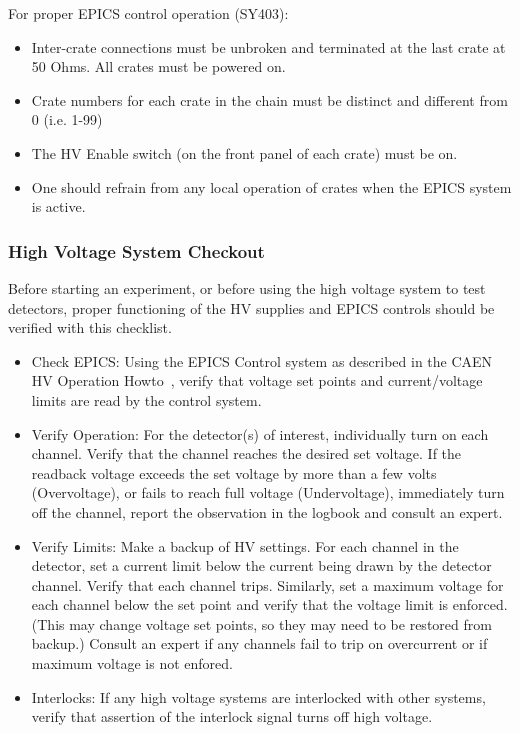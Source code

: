 {For proper EPICS control operation (SY403):

\begin{itemize}
\item{Inter-crate connections must be unbroken and terminated at the
last crate at 50 Ohms.  All crates must be powered on.}
\item{Crate numbers for each crate in the chain must be distinct and
different from 0 (i.e. 1-99)}
\item{The HV Enable switch (on the front panel of each crate) must be on.}
\item{One should refrain from any local operation of crates when the
EPICS system is active.}
\end{itemize}
}

\subsubsection{High Voltage System Checkout}
\label{sec:highvoltagecheckout}

Before starting an experiment, or before using the high voltage system to
test detectors, proper functioning of the HV supplies and EPICS controls
should be verified with this checklist.
\begin{itemize}
  \item{Check EPICS: Using the EPICS Control system as described in the CAEN HV
  Operation Howto~\cite{howto:CAEN_HV_operation}, verify that voltage set
  points and current/voltage limits are read by the control system.}
  \item{Verify Operation: For the detector(s) of interest, individually
  turn on each channel.  Verify that the channel reaches the desired
  set voltage.  If the readback voltage exceeds the set voltage by more
  than a few volts
  (Overvoltage), or fails to reach full voltage (Undervoltage), immediately
  turn off the channel, report the observation in the logbook and consult
  an expert.}
  \item{Verify Limits: Make a backup of HV settings.  For each channel in the
  detector, set a current limit below the current being drawn by the detector
  channel.  Verify that each channel trips.  Similarly, set a maximum voltage
  for each channel below the set point and verify that the voltage limit
  is enforced.  (This may change voltage set points, so they may need to
  be restored from backup.)  Consult an expert if any channels fail to trip
  on overcurrent or if maximum voltage is not enfored.}
  \item{Interlocks: If any high voltage systems are interlocked with other
  systems, verify that assertion of the interlock signal turns off high
  voltage.}
\end{itemize}

